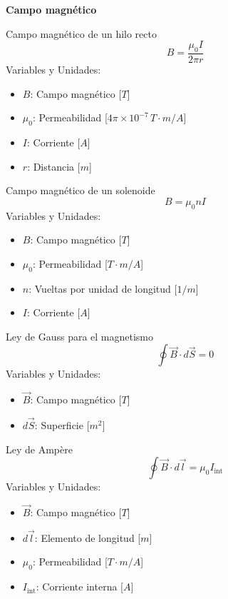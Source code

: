 \documentclass{article}
\begin{document}
\newpage

\begin{center}
    \LARGE \textbf{Campo magnético}
\end{center}

\begin{multicols}{3}

\begin{teorema}{Campo magnético de un hilo recto}
    $$B = \frac{\mu_0 I}{2\pi r}$$
    Variables y Unidades:
    \begin{itemize}
        \item $B$: Campo magnético [$T$]
        \item $\mu_0$: Permeabilidad [$4\pi \times 10^{-7} \, T\cdot m/A$]
        \item $I$: Corriente [$A$]
        \item $r$: Distancia [$m$]
    \end{itemize}
\end{teorema}

\begin{teorema}{Campo magnético de un solenoide}
    $$B = \mu_0 n I$$
    Variables y Unidades:
    \begin{itemize}
        \item $B$: Campo magnético [$T$]
        \item $\mu_0$: Permeabilidad [$T\cdot m/A$]
        \item $n$: Vueltas por unidad de longitud [$1/m$]
        \item $I$: Corriente [$A$]
    \end{itemize}
\end{teorema}

\begin{teorema}{Ley de Gauss para el magnetismo}
    $$\oint \vec{B} \cdot d\vec{S} = 0$$
    Variables y Unidades:
    \begin{itemize}
        \item $\vec{B}$: Campo magnético [$T$]
        \item $d\vec{S}$: Superficie [$m^2$]
    \end{itemize}
\end{teorema}

\columnbreak

\begin{teorema}{Ley de Ampère}
    $$\oint \vec{B} \cdot d\vec{l} = \mu_0 I_{\text{int}}$$
    Variables y Unidades:
    \begin{itemize}
        \item $\vec{B}$: Campo magnético [$T$]
        \item $d\vec{l}$: Elemento de longitud [$m$]
        \item $\mu_0$: Permeabilidad [$T\cdot m/A$]
        \item $I_{\text{int}}$: Corriente interna [$A$]
    \end{itemize}
\end{teorema}


\end{multicols}
\end{document}
